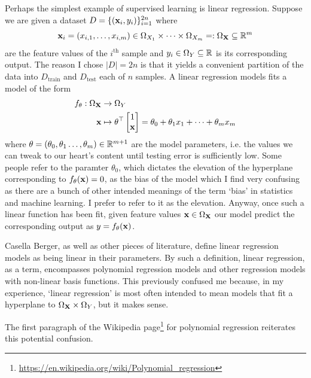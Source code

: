 \documentclass[11pt]{article}
\begin{document}
Perhaps the simplest example of supervised learning is linear regression. Suppose we are given a dataset $D=\{(\mathbf{x}_i,y_i)\}_{i=1}^{2n}$ where
$$
\mathbf{x}_i=(x_{i,1},\dots,x_{i, m})\in \Omega_{X_1}\times\dots\times \Omega_{X_m}=:\Omega_{\mathbf{X}}\subseteq\mathbb{R}^m
$$
are the feature values of the $i^{\text{th}}$ sample and $y_i\in \Omega_{Y}\subseteq\mathbb{R}$ is its corresponding output. The reason I chose $|D|=2n$ is that it yields a convenient partition of the data into $D_{\text{train}}$ and $D_{\text{test}}$ each of $n$ samples. A linear regression models fits a model of the form
\begin{align*}
    f_{\theta}:\Omega_{\mathbf{X}}&\rightarrow \Omega_Y\\
    \mathbf{x}&\mapsto
    \theta^{\top}
    \begin{bmatrix}
        1\\
        \mathbf{x}
    \end{bmatrix}
    =
    \theta_0+\theta_1x_1+\dots+\theta_mx_m 
\end{align*}
where $\theta=(\theta_0,\theta_1\dots,\theta_m)\in\mathbb{R}^{m+1}$ are the model parameters, i.e. the values we can tweak to our heart's content until testing error is sufficiently low. Some people refer to the paramter $\theta_0$, which dictates the elevation of the hyperplane corresponding to $f_{\theta}(\mathbf{x})=0$, as the bias of the model which I find very confusing as there are a bunch of other intended meanings of the term `bias' in statistics and machine learning. I prefer to refer to it as the elevation. Anyway, once such a linear function has been fit, given feature values $\mathbf{x}\in\Omega_{\mathbf{X}}$ our model predict the corresponding output as $y=f_{\theta}(\mathbf{x})$.

\begin{tcolorbox}[title={\centering\textbf{What does the `linear' in linear regression actually refer to?}}, colback=myLightBlue, colbacktitle=myDarkBlue, colframe=myDarkBlue, coltitle=white]
    Casella Berger, as well as other pieces of literature, define linear regression models as being linear in their parameters. By such a definition, linear regression, as a term, encompasses polynomial regression models and other regression models with non-linear basis functions. This previously confused me because, in my experience, `linear regression' is most often intended to mean models that fit a hyperplane to $\Omega_{\mathbf{X}}\times\Omega_Y$, but it makes sense.
    
    \hspace{14.52pt} The first paragraph of the Wikipedia page\footnote{\url{https://en.wikipedia.org/wiki/Polynomial_regression}} for polynomial regression reiterates this potential confusion.
\end{tcolorbox}
\end{document}
